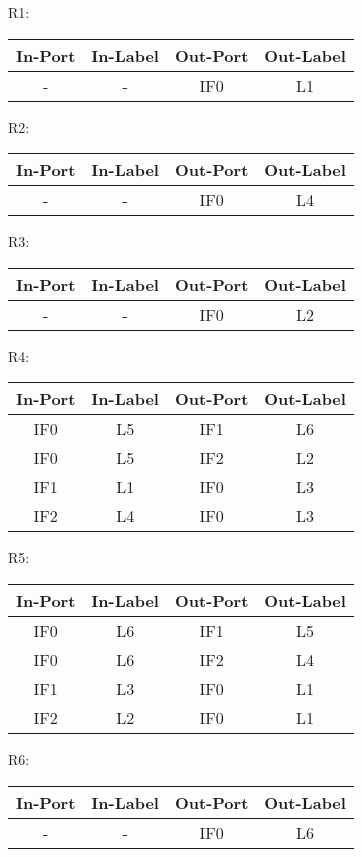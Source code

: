 \documentclass[paper=a4, fontsize=11pt]{scrartcl}
\numberwithin{equation}{section}
\numberwithin{figure}{section}
\numberwithin{table}{section}
\begin{document}
R1:\newline
\begin{tabular}{c|c|c|c}
In-Port & In-Label & Out-Port & Out-Label \\\hline
- & - & IF0 & L1 \\
\end{tabular}\newline
R2:\newline
\begin{tabular}{c|c|c|c}
In-Port & In-Label & Out-Port & Out-Label \\\hline
- & - & IF0 & L4 \\
\end{tabular}\newline
R3:\newline
\begin{tabular}{c|c|c|c}
In-Port & In-Label & Out-Port & Out-Label \\\hline
- & - & IF0 & L2\\
\end{tabular}\newline
R4:\newline
\begin{tabular}{c|c|c|c}
In-Port & In-Label & Out-Port & Out-Label \\\hline
IF0 & L5 & IF1 & L6\\\hline
IF0 & L5 & IF2 & L2\\\hline
IF1 & L1 & IF0 & L3\\\hline
IF2 & L4 & IF0 & L3\\
\end{tabular}\newline
R5:\newline
\begin{tabular}{c|c|c|c}
In-Port & In-Label & Out-Port & Out-Label \\\hline
IF0 & L6 & IF1 & L5\\\hline
IF0 & L6 & IF2 & L4\\\hline
IF1 & L3 & IF0 & L1\\\hline
IF2 & L2 & IF0 & L1\\
\end{tabular}\newline
R6:\newline
\begin{tabular}{c|c|c|c}
In-Port & In-Label & Out-Port & Out-Label \\\hline
- & - & IF0 & L6\\
\end{tabular}\newline
\end{document}
